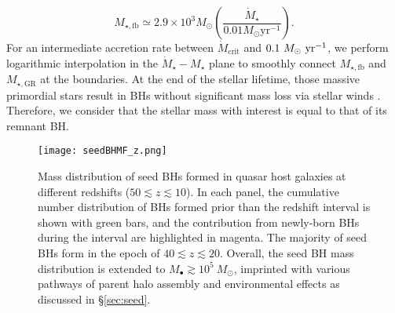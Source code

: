 \documentclass[twocolumn, twocolappendix]{aastex63}
\newcommand{\Msun}{M_\odot}
\newcommand{\Msunyr}{M_\odot~{\rm yr}^{-1}}
\newcommand{\Mdot}{\dot{M}}
\newcommand{\red}[1]{\textcolor{red}{ #1}}
\begin{document}
\begin{CJK*}{UTF8}{gbsn}
%
\begin{equation}
M_{\star, \mathrm{fb}} \simeq 2.9 \times 10^{3} \Msun\left(\frac{\dot{M}_{\star}}{0.01 M_{\odot} \mathrm{yr}^{-1}}\right).
\end{equation}
%
For an intermediate accretion rate between $\Mdot_\mathrm{crit}$ and $0.1~\Msunyr$, 
we perform logarithmic interpolation in the $\Mdot_\star - M_\star$ plane to smoothly connect 
$M_{\star, \mathrm{fb}}$ and $M_{\star, \mathrm{GR}}$ at the boundaries.
At the end of the stellar lifetime, those massive primordial stars result in BHs without significant mass loss 
via stellar winds \citep{2003ApJ...591..288H,2010ApJ...714.1217B,2015MNRAS.451.4086S}.
Therefore, we consider that the stellar mass with interest is equal to that of its remnant BH.


\begin{figure*}
\centering
\texttt{[image: seedBHMF\_z.png]}
\caption{
Mass distribution of seed BHs formed in quasar host galaxies at different redshifts ($50\lesssim z \lesssim 10$).
In each panel, the cumulative number distribution of BHs formed prior than the redshift interval is shown with green bars,
and the contribution from newly-born BHs during the interval are highlighted in magenta.
The majority of seed BHs form in the epoch of $40\lesssim z \lesssim 20$.
Overall, the seed BH mass distribution is extended to $M_\bullet \gtrsim 10^5~\Msun$, 
imprinted with various pathways of parent halo assembly and environmental effects as discussed in \S\ref{sec:seed}.
}
\label{fig:seedmf}
\end{figure*}



\end{CJK*}
\end{document}
